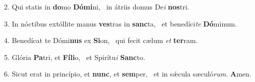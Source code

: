 2. Qui statis in \textbf{do}mo \textbf{Dó}\textbf{mi}ni, \ast\  in átriis domus De\textit{i} \textbf{nos}tri.\

3. In nóctibus extóllite manus \textbf{ves}tras in \textbf{sanc}ta, \ast\  et benedíci\textit{te} \textbf{Dó}minum.\

4. Benedícat te Dómi\textbf{nus} ex \textbf{Si}on, \ast\  qui fecit cælum \textit{et} \textbf{ter}ram.\

5. Glória \textbf{Pa}tri, et \textbf{Fí}\textbf{li}o, \ast\  et Spirítu\textit{i} \textbf{Sanc}to.\

6. Sicut erat in princípio, et \textbf{nunc}, et \textbf{sem}per, \ast\  et in sǽcula sæculó\textit{rum}. \textbf{A}men.\

